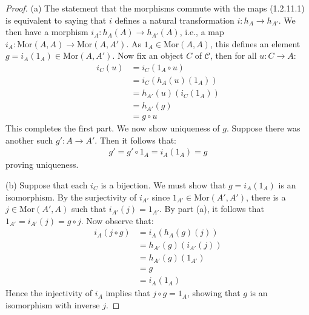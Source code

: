 \documentclass{amsart}
\begin{document}
\begin{proof}
		(a) The statement that the morphisms commute with the maps (1.2.11.1) is equivalent to saying that $i$ defines a natural transformation $i:h_A\rightarrow h_{A'}$. We then have a morphism $i_A:h_A(A)\rightarrow h_{A'}(A)$, i.e., a map $i_A:\mathrm{Mor}(A, A)\rightarrow\mathrm{Mor}(A,A')$. As $1_A\in \mathrm{Mor}(A, A)$, this defines an element $g=i_A(1_A)\in \mathrm{Mor}(A, A')$. Now fix an object $C$ of $\mathscr{C}$, then for all $u:C\rightarrow A$:
    \begin{align*}
        i_C(u) &= i_C(1_A\circ u) \\
        &= i_C(h_A(u)(1_A)) \tag{definition of what $h_A$ does to arrows} \\
        &= h_{A'}(u)(i_C(1_A)) \tag{naturality of $i$} \\
        &= h_{A'}(g) \\
        &= g\circ u
    \end{align*}
    This completes the first part. We now show uniqueness of $g$. Suppose there was another such $g':A\rightarrow A'$. Then it follows that:
    \begin{align*}
        g' = g'\circ 1_A = i_A(1_A) = g
    \end{align*}
    proving uniqueness. 

    \vspace{0.1in}

    (b) Suppose that each $i_C$ is a bijection. We must show that $g=i_A(1_A)$ is an isomorphism. By the surjectivity of $i_{A'}$ since $1_{A'}\in\mathrm{Mor}(A',A')$, there is a $j\in\mathrm{Mor}(A',A)$ such that $i_{A'}(j)=1_{A'}$. By part (a), it follows that $1_{A'}=i_{A'}(j)= g\circ j$. Now observe that:
    \begin{align*}
        i_A (j\circ g) &= i_A(h_A(g)(j)) \\
        &= h_{A'}(g)(i_{A'}(j)) \tag{naturality of $i$} \\
        &= h_{A'}(g)(1_{A'}) \\
        &= g \\
        &= i_A(1_A)
    \end{align*}
    Hence the injectivity of $i_A$ implies that $j\circ g=1_A$, showing that $g$ is an isomorphism with inverse $j$. 
\end{proof}

\vspace{0.1in}

\end{document}
